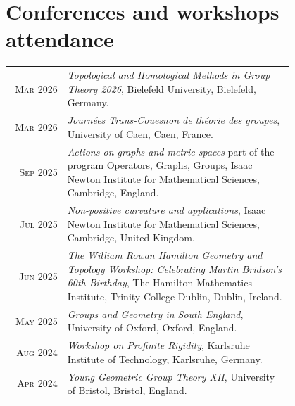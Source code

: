 \documentclass[a4paper,10pt]{article} %
\begin{document}

\section{Conferences and workshops attendance}

\begin{longtable}{rp{0.8\linewidth}}


	\textsc{Mar 2026} & \emph{Topological and Homological Methods in Group Theory 2026}, Bielefeld
    University, Bielefeld, Germany. \\ %
    
	\textsc{Mar 2026} & \emph{Journées Trans-Couesnon de théorie des groupes}, University of Caen, Caen, France. \\ %

	\textsc{Sep 2025} &\emph{Actions on graphs and metric spaces} part of the program Operators, Graphs, Groups, Isaac Newton Institute for Mathematical Sciences, Cambridge, England. \\ %

	\textsc{Jul 2025} &\emph{Non-positive curvature and applications}, Isaac Newton Institute for Mathematical Sciences, Cambridge, United Kingdom. \\ %
	
	\textsc{Jun 2025} & \emph{The William Rowan Hamilton Geometry and Topology Workshop: Celebrating Martin Bridson's 60th Birthday}, The Hamilton Mathematics Institute, Trinity College Dublin, Dublin, Ireland. \\ %
	
	\textsc{May 2025} & \emph{Groups and Geometry in South England}, University of Oxford, Oxford, England. \\ %

    \textsc{Aug 2024} & \emph{Workshop on Profinite Rigidity}, Karlsruhe Institute of Technology, Karlsruhe, Germany. \\ %

    \textsc{Apr 2024} & \emph{Young Geometric Group Theory XII}, University of Bristol, Bristol, England. \\ %
    

\end{longtable}
\end{document}
